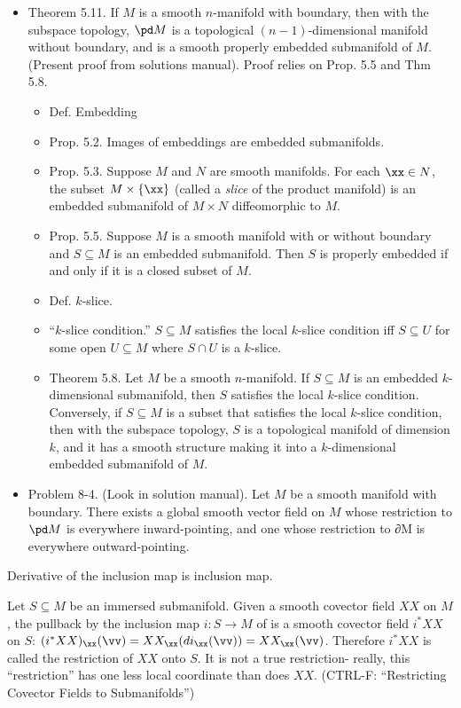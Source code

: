 \begin{itemize}
    \item Theorem 5.11. If $M$ is a smooth $n$-manifold with boundary, then with the subspace topology, $\pd M$ is a topological $(n - 1)$-dimensional manifold without boundary, and is a smooth properly embedded submanifold of $M$. (Present proof from solutions manual). Proof relies on Prop. 5.5 and Thm 5.8.
    \begin{itemize}
    \item Def. Embedding
    \item Prop. 5.2. Images of embeddings are embedded submanifolds.
    \item Prop. 5.3. Suppose $M$ and $N$ are smooth manifolds. For each $\xx \in N$, the subset $M \times \{\xx\}$ (called a \textit{slice} of the product manifold) is an embedded submanifold of $M \times N$ diffeomorphic to $M$.
    \item Prop. 5.5. Suppose $M$ is a smooth manifold with or without boundary and $S \subseteq M$ is an embedded submanifold. Then $S$ is properly embedded if and only if it is a closed subset of $M$.
    \item Def. $k$-slice.
    \item ``$k$-slice condition.'' $S \subseteq M$ satisfies the local $k$-slice condition iff $S \subseteq U$ for some open $U \subseteq M$ where $S \cap U$ is a $k$-slice.
    \item Theorem 5.8. Let $M$ be a smooth $n$-manifold. If $S \subseteq M$ is an embedded $k$-dimensional submanifold, then $S$ satisfies the local $k$-slice condition. Conversely, if $S \subseteq M$ is a subset that satisfies the local $k$-slice condition, then with the subspace topology, $S$ is a topological manifold of dimension $k$, and it has a smooth structure making it into a $k$-dimensional embedded submanifold of $M$.
\end{itemize}
    \item Problem 8-4. (Look in solution manual). Let $M$ be a smooth manifold with boundary. There exists a global smooth vector field on $M$ whose restriction to $\pd M$ is everywhere inward-pointing, and one whose restriction to ∂M is everywhere outward-pointing.
\end{itemize}

\item Derivative of the inclusion map is inclusion map. 
    
Let $S \subseteq M$ be an immersed submanifold. Given a smooth covector field $XX$ on $M$, the pullback by the inclusion map $i:S \rightarrow M$ of  is a smooth covector field $i^* XX$ on $S$: $(i^* XX)_\xx(\vv) = XX_\xx(di_\xx(\vv)) = XX_\xx(\vv)$. Therefore $i^* XX$ is called the restriction of $XX$ onto $S$. It is not a true restriction- really, this ``restriction'' has one less local coordinate than does $XX$. (CTRL-F: ``Restricting Covector Fields to Submanifolds'')

